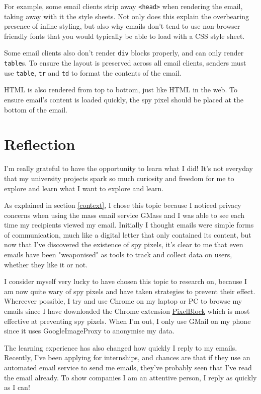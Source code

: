 \documentclass{article}
\begin{document}
For example, some email clients strip away \texttt{<head>} when rendering the email, taking away with it the style sheets. Not only does this explain the overbearing presence of inline styling, but also why emails don't tend to use non-browser friendly fonts that you would typically be able to load with a CSS style sheet.

Some email clients also don't render \texttt{div} blocks properly, and can only render \texttt{table}s. To ensure the layout is preserved across all email clients, senders must use \texttt{table}, \texttt{tr} and \texttt{td} to format the contents of the email.

HTML is also rendered from top to bottom, just like HTML in the web. To ensure email's content is loaded quickly, the spy pixel should be placed at the bottom of the email.

\section{Reflection}

I'm really grateful to have the opportunity to learn what I did! It's not everyday that my university projects spark so much curiosity and freedom for me to explore and learn what I want to explore and learn.

As explained in section \ref{context}, I chose this topic because I noticed privacy concerns when using the mass email service GMass and I was able to see each time my recipients viewed my email. Initially I thought emails were simple forms of communication, much like a digital letter that only contained its content, but now that I've discovered the existence of spy pixels, it's clear to me that even emails have been "weaponised" as tools to track and collect data on users, whether they like it or not.

I consider myself very lucky to have chosen this topic to research on, because I am now quite wary of spy pixels and have taken strategies to prevent their effect. Whereever possible, I try and use Chrome on my laptop or PC to browse my emails since I have downloaded the Chrome extension \href{https://chrome.google.com/webstore/detail/pixelblock/jmpmfcjnflbcoidlgapblgpgbilinlem?hl=en}{PixelBlock} which is most effective at preventing spy pixels. When I'm out, I only use GMail on my phone since it uses GoogleImageProxy to anonymise my data.

The learning experience has also changed how quickly I reply to my emails. Recently, I've been applying for internships, and chances are that if they use an automated email service to send me emails, they've probably seen that I've read the email already. To show companies I am an attentive person, I reply as quickly as I can!
\end{document}
